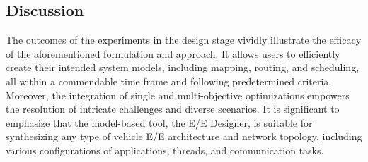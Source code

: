     
    
    \subsection{Discussion}
        
    The outcomes of the experiments in the design stage vividly illustrate the efficacy of the aforementioned formulation and approach. It allows users to efficiently create their intended system models, including mapping, routing, and scheduling, all within a commendable time frame and following predetermined criteria. Moreover, the integration of single and multi-objective optimizations empowers the resolution of intricate challenges and diverse scenarios.
    It is significant to emphasize that the model-based tool, the E/E Designer, is suitable for synthesizing any type of vehicle E/E architecture and network topology, including various configurations of applications, threads, and communication tasks.
    
    
    
    
 

